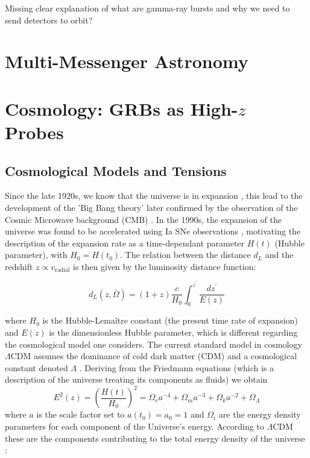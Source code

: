 \documentclass[
    aps,
    prd,
    twocolumn,
    nofootinbib,
    floatfix,
    superscriptaddress,
]{revtex4-2}
\begin{document}
Missing clear explanation of what are gamma-ray bursts and why we need to send detectors to orbit?


\section{Multi-Messenger Astronomy}\label{sec:mma}



\section{Cosmology: GRBs as High-$z$ Probes}

\subsection{Cosmological Models and Tensions}

Since the late 1920s, we know that the universe is in expansion \cite{Hubble_1929, Lemaitre_1927}, this lead to the development of the 'Big Bang theory' later confirmed by the observation of the Cosmic Microwave background (CMB) \cite{Penzias_Wilson_1965, Dicke_1965}. In the 1990s, the expansion of the universe was found to be accelerated using Ia SNe observations \cite{Riess_1998, Perlmutter_1999}, motivating the description of the expansion rate as a time-dependant parameter $H(t)$ (Hubble parameter), with $H_0 = H(t_0)$. The relation between the distance $d_L$ and the redshift $z \propto v_\text{radial}$ is then given by the luminosity distance function:

$$
d_L (z, \overline\Omega) = (1+z) \frac{c}{H_0} \int_0 ^{z^\prime} \frac{dz^\prime}{E(z)}
$$

where $H_0$ is the Hubble-Lemaître constant (the present time rate of expansion) and $E(z)$ is the dimensionless Hubble parameter, which is different regarding the cosmological model one considers. The current standard model in cosmology $\Lambda$CDM assumes the dominance of cold dark matter (CDM) and a cosmological constant denoted $\Lambda$ \cite{missing}. Deriving from the Friedmann equations \cite{missing} (which is a description of the universe treating its components as fluids) we obtain
$$
E^2(z) = \left(\frac{H(t)}{H_0}\right)^2 = \Omega_r a^{-4} + \Omega_m a^{-3} + \Omega_k a^{-2} + \Omega_\Lambda
$$
where $a$ is the scale factor set to $a(t_0) = a_0 = 1$ and $\Omega_i$ are the energy density parameters for each component of the Universe's energy. According to $\Lambda$CDM these are the components contributing to the total energy density of the universe \cite{missing}:
\end{document}
